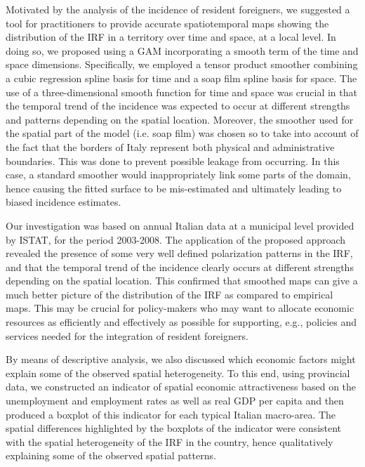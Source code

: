 \documentclass[12pt]{article}
\theoremstyle{definition}
\theoremstyle{plain}
\begin{document}
Motivated by the analysis of the incidence of resident foreigners, we suggested a tool for practitioners to provide accurate spatiotemporal maps showing the distribution of the IRF in a territory over time and space, at a local level. In doing so, we proposed using a GAM incorporating a smooth term of the time and space dimensions. Specifically, we employed a tensor product smoother combining a cubic regression spline basis for time and a soap film spline basis for space. The use of a three-dimensional smooth function for time and space was crucial in that the temporal trend of the incidence was expected to occur at different strengths and patterns depending on the spatial location. Moreover, the smoother used for the spatial part of the model (i.e. soap film) was chosen so to take into account of the fact that the borders of Italy represent both physical and administrative boundaries. This was done to prevent possible leakage from occurring. In this case, a standard smoother would inappropriately link some parts of the domain, hence causing the fitted surface to be mis-estimated and ultimately leading to biased incidence estimates.

Our investigation was based on annual Italian data at a municipal level provided by ISTAT, for the period 2003-2008. The application of the proposed approach revealed the presence of some very well defined polarization patterns in the IRF, and that the temporal trend of the incidence clearly occurs at different strengths depending on the spatial location. This confirmed that smoothed maps can give a much better picture of the distribution of the IRF as compared to empirical maps. This may be crucial for policy-makers who may want to allocate economic resources as efficiently and effectively as possible for supporting, e.g., policies and services needed for the integration of resident foreigners.

By means of descriptive analysis, we also discussed which economic factors might explain some of the observed spatial heterogeneity. To this end, using provincial data, we constructed an indicator of spatial economic attractiveness based on the unemployment and employment rates as well as real GDP per capita and then produced a boxplot of this indicator for each typical Italian macro-area. The spatial differences highlighted by the boxplots of the indicator were consistent with the spatial heterogeneity of the IRF in the country, hence qualitatively explaining some of the observed spatial patterns.
\end{document}

